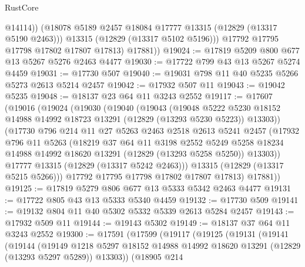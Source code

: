 \begin{lexlean}{RustCore}
\begin{coremodule}
                @14114))
            (@18078 @5189 @2457 @18084 @17777 @13315 (@12829 (@13317 @5190 @2463)))
            @13315
            (@12829 (@13317 @5102 @5196)))
          @17792
          @17795
          @17798
          @17802
          @17807
          @17813)
        @17881))
@19024 := @17819 @5209 @800 @677 @13 @5267 @5276 @2463 @4477
@19030 := @17722 @799 @43 @13 @5267 @5274 @4459
@19031 := @17730 @507
@19040 := @19031 @798 @11 @40 @5235 @5266 @5273 @2613 @5214 @2457
@19042 := @17932 @507 @11
@19043 := @19042 @5235
@19048 := @18137 @23 @64 @11 @3243 @2552
@19117 := @17607
    (@19016
      (@19024
        (@19030
          (@19040
            (@19043
              (@19048
                @5222
                @5230
                @18152
                @14988
                @14992
                @18723
                @13291
                (@12829 (@13293 @5230 @5223))
                @13303))
            (@17730
              @796
              @214
              @11
              @27
              @5263
              @2463
              @2518
              @2613
              @5241
              @2457
              (@17932
                @796
                @11
                @5263
                (@18219
                  @37
                  @64
                  @11
                  @3198
                  @2552
                  @5249
                  @5258
                  @18234
                  @14988
                  @14992
                  @18620
                  @13291
                  (@12829 (@13293 @5258 @5250))
                  @13303))
              @17777
              @13315
              (@12829 (@13317 @5242 @2463)))
            @13315
            (@12829 (@13317 @5215 @5266)))
          @17792
          @17795
          @17798
          @17802
          @17807
          @17813)
        @17881))
@19125 := @17819 @5279 @806 @677 @13 @5333 @5342 @2463 @4477
@19131 := @17722 @805 @43 @13 @5333 @5340 @4459
@19132 := @17730 @509
@19141 := @19132 @804 @11 @40 @5302 @5332 @5339 @2613 @5284 @2457
@19143 := @17932 @509 @11
@19144 := @19143 @5302
@19149 := @18137 @37 @64 @11 @3243 @2552
@19300 := @17591
    (@17599
      (@19117
        (@19125
          (@19131
            (@19141
              (@19144
                (@19149
                  @1218
                  @5297
                  @18152
                  @14988
                  @14992
                  @18620
                  @13291
                  (@12829 (@13293 @5297 @5289))
                  @13303))
              (@18905
                @214

\end{coremodule}
\end{lexlean}

